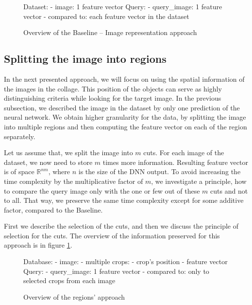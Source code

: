 \begin{figure}
\centering
\begin{boxedverbatim}
Dataset:
    - image: 1 feature vector
Query:
    - query_image: 1 feature vector
    - compared to: each feature vector in the dataset
\end{boxedverbatim}
\caption{Overview of the Baseline -- Image representation approach}
\end{figure}

\subsection{Splitting the image into regions}

In the next presented approach, we will focus on using the spatial information of the images in the collage. This position of the objects can serve as highly distinguishing criteria while looking for the target image. In the previous subsection, we described the image in the dataset by only one prediction of the neural network. We obtain higher granularity for the data, by splitting the image into multiple regions and then computing the feature vector on each of the region separately.

Let us assume that, we split the image into $m$ cuts. For each image of the dataset, we now need to store $m$ times more information. Resulting feature vector is of space $\mathbb{R}^{nm}$, where $n$ is the size of the DNN output. To avoid increasing the time complexity by the multiplicative factor of $m$, we investigate a principle, how to compare the query image only with the one or few out of these $m$ cuts and not to all. That way, we preserve the same time complexity except for some additive factor, compared to the Baseline.

First we describe the selection of the cuts, and then we discuss the principle of selection for the cuts. The overview of the information preserved for this approach is in figure \ref{fig:overview_regions}.

\begin{figure}
\centering
\begin{boxedverbatim}
Database:
    - image:
        - multiple crops:
            - crop's position
            - feature vector
Query:
    - query_image: 1 feature vector
    - compared to: only to selected crops from each image
\end{boxedverbatim}
\caption{Overview of the regions' approach}
\label{fig:overview_regions}
\end{figure}

